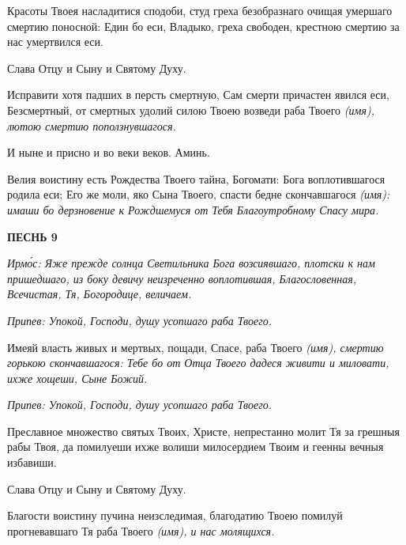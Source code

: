    Красоты Твоея насладитися сподоби, студ греха безобразнаго очищая
умершаго смертию поносной: Един бо еси, Владыко, греха свободен,
крестною смертию за нас умертвился еси.



   Слава Отцу и Сыну и Святому Духу.



   Исправити хотя падших в персть смертную, Сам смерти причастен
явился еси, Безсмертный, от смертных удолий силою Твоею возведи раба
Твоего \itshape  (имя)\normalfont{}, лютою смертию поползнувшагося.



   И ныне и присно и во веки веков. Аминь.



   Велия воистину есть Рождества Твоего тайна, Богомати: Бога
воплотившагося родила еси; Его же моли, яко Сына Твоего, спасти бедне
скончавшагося \itshape  (имя)\normalfont{}: имаши бо дерзновение к Рождшемуся от Тебя
Благоутробному Спасу мира.



 

\bfseries ПЕСНЬ 9\normalfont{}


 \itshape Ирмо́с:\normalfont{} Яже прежде солнца Светильника Бога возсиявшаго, плотски к нам
пришедшаго, из боку девичу неизреченно воплотившая, Благословенная, Всечистая,
Тя, Богородице, величаем.



 \itshape Припев:\normalfont{} Упокой, Господи, душу усопшаго раба Твоего.



   Имеяй власть живых и мертвых, пощади, Спасе, раба Твоего \itshape  (имя)\normalfont{},
смертию горькою скончавшагося: Тебе бо от Отца Твоего дадеся живити и
миловати, ихже хощеши, Сыне Божий.



 \itshape Припев:\normalfont{} Упокой, Господи, душу усопшаго раба Твоего.



   Преславное множество святых Твоих, Христе, непрестанно молит Тя за
грешныя рабы Твоя, да помилуеши ихже волиши милосердием Твоим и
геенны вечныя избавиши.



   Слава Отцу и Сыну и Святому Духу.



   Благости воистину пучина неизследимая, благодатию Твоею помилуй
прогневавшаго Тя раба Твоего \itshape  (имя)\normalfont{}, и нас молящихся.



